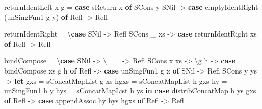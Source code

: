 \documentclass[]{article}
\newenvironment{Shaded}{}{}
\newcommand{\DataTypeTok}[1]{\textcolor[rgb]{0.56,0.13,0.00}{#1}}
\newcommand{\KeywordTok}[1]{\textcolor[rgb]{0.00,0.44,0.13}{\textbf{#1}}}
\newcommand{\NormalTok}[1]{#1}
\newcommand{\OtherTok}[1]{\textcolor[rgb]{0.00,0.44,0.13}{#1}}
\begin{document}
\begin{Shaded}
\begin{Highlighting}[]
\NormalTok{    returnIdentLeft x g }\OtherTok{=} \KeywordTok{case}\NormalTok{ sReturn x }\KeywordTok{of}
      \DataTypeTok{SCons}\NormalTok{ y }\DataTypeTok{SNil} \OtherTok{{-}>} \KeywordTok{case}\NormalTok{ emptyIdentRight (unSingFun1 g y) }\KeywordTok{of}
        \DataTypeTok{Refl} \OtherTok{{-}>} \DataTypeTok{Refl}

\NormalTok{    returnIdentRight }\OtherTok{=}\NormalTok{ \textbackslash{}}\KeywordTok{case}
      \DataTypeTok{SNil}       \OtherTok{{-}>} \DataTypeTok{Refl}
      \DataTypeTok{SCons}\NormalTok{ \_ xs }\OtherTok{{-}>} \KeywordTok{case}\NormalTok{ returnIdentRight xs }\KeywordTok{of}
        \DataTypeTok{Refl} \OtherTok{{-}>} \DataTypeTok{Refl}

\NormalTok{    bindCompose }\OtherTok{=}\NormalTok{ \textbackslash{}}\KeywordTok{case}
      \DataTypeTok{SNil}       \OtherTok{{-}>}\NormalTok{ \textbackslash{}\_ \_ }\OtherTok{{-}>} \DataTypeTok{Refl}
      \DataTypeTok{SCons}\NormalTok{ x xs }\OtherTok{{-}>}\NormalTok{ \textbackslash{}g h }\OtherTok{{-}>} \KeywordTok{case}\NormalTok{ bindCompose xs g h }\KeywordTok{of}
        \DataTypeTok{Refl} \OtherTok{{-}>} \KeywordTok{case}\NormalTok{ unSingFun1 g x }\KeywordTok{of}
          \DataTypeTok{SNil}       \OtherTok{{-}>} \DataTypeTok{Refl}
          \DataTypeTok{SCons}\NormalTok{ y ys }\OtherTok{{-}>}
            \KeywordTok{let}\NormalTok{ gxs  }\OtherTok{=}\NormalTok{ sConcatMapList g xs}
\NormalTok{                hgxs }\OtherTok{=}\NormalTok{ sConcatMapList h gxs}
\NormalTok{                hy   }\OtherTok{=}\NormalTok{ unSingFun1 h y}
\NormalTok{                hys  }\OtherTok{=}\NormalTok{ sConcatMapList h ys}
            \KeywordTok{in}  \KeywordTok{case}\NormalTok{ distribConcatMap h ys gxs }\KeywordTok{of}
                  \DataTypeTok{Refl} \OtherTok{{-}>} \KeywordTok{case}\NormalTok{ appendAssoc hy hys hgxs }\KeywordTok{of}
                    \DataTypeTok{Refl} \OtherTok{{-}>} \DataTypeTok{Refl}


\end{Highlighting}
\end{Shaded}
\end{document}
